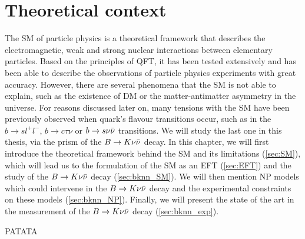 \chapter{Theoretical context} \label{ch:theory}


The \gls{SM} of particle physics is a theoretical framework that describes the electromagnetic, weak and strong nuclear interactions between elementary particles. 
Based on the principles of \gls{QFT}, it has been tested extensively and has been able to describe the observations of particle physics experiments with great accuracy. 
However, there are several phenomena that the \gls{SM} is not able to explain, such as the existence of \gls{DM} or the matter-antimatter asymmetry in the universe. 
For reasons discussed later on, many tensions with the \gls{SM} have been previously observed when quark's flavour transitions occur, such as in the $b \to s l^+ l^-$, $b \to c \tau \nu$ or $b \to s \nu \Bar{\nu}$ transitions. 
We will study the last one in this thesis, via the prism of the $B \to K \nu \Bar{\nu}$ decay.
In this chapter, we will first introduce the theoretical framework behind the \gls{SM} and its limitations (\ref{sec:SM}), which will lead us to the formulation of the \gls{SM} as an \gls{EFT} (\ref{sec:EFT}) and the study of the $B \to K \nu \Bar{\nu}$ decay (\ref{sec:bknn_SM}).
We will then mention \gls{NP} models which could intervene in the $B \to K \nu \Bar{\nu}$ decay and the experimental constraints on these models (\ref{sec:bknn_NP}).
Finally, we will present the state of the art in the measurement of the $B \to K \nu \Bar{\nu}$ decay (\ref{sec:bknn_exp}).











PATATA

\cite{kolmogorov}